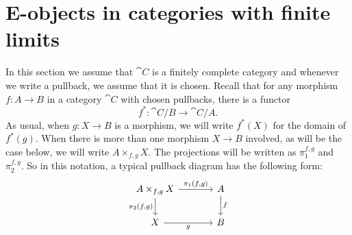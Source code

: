 \section{E-objects in categories with finite limits}
In this section we assume that $\cat{C}$ is a finitely complete category and
whenever we write a pullback, we assume that it is chosen. Recall that for
any morphism $f:A\to B$ in a category $\cat{C}$ with chosen pullbacks, there
is a functor
\begin{equation*}
f^\ast : \cat{C}/B\to\cat{C}/A.
\end{equation*}
As usual, when $g:X\to B$ is a morphism, we will write $f^\ast(X)$ for the
domain of $f^\ast(g)$. When there is more than one morphism $X\to B$ involved,
as will be the case below, we will write $A\times_{f,g}X$. The projections
will be written as $\pi_1^{f,g}$ and $\pi_2^{f,g}$. So in this notation, a
typical pullback diagram has the following form:
\begin{equation*}
\begin{tikzcd}[column sep=large]
\pullback{A}{X}{f}{g}
  \ar{r}{\pullbackpr{1}{f}{g}}
  \ar{d}[swap]{\pullbackpr{2}{f}{g}}
  &
A \ar{d}{f}
  \\
X \ar{r}[swap]{g}
  &
B
\end{tikzcd}
\end{equation*}

